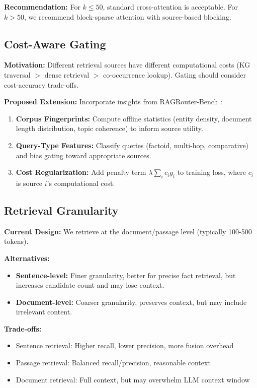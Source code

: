 \documentclass[11pt,a4paper]{article}
\begin{document}
\textbf{Recommendation:} For $k \leq 50$, standard cross-attention is acceptable. For $k > 50$, we recommend block-sparse attention with source-based blocking.

\subsection{Cost-Aware Gating}
\label{sec:cost_aware}

\textbf{Motivation:} Different retrieval sources have different computational costs (KG traversal $>$ dense retrieval $>$ co-occurrence lookup). Gating should consider cost-accuracy trade-offs.

\textbf{Proposed Extension:} Incorporate insights from RAGRouter-Bench \citep{ragrouter2024}:
\begin{enumerate}
    \item \textbf{Corpus Fingerprints:} Compute offline statistics (entity density, document length distribution, topic coherence) to inform source utility.
    
    \item \textbf{Query-Type Features:} Classify queries (factoid, multi-hop, comparative) and bias gating toward appropriate sources.
    
    \item \textbf{Cost Regularization:} Add penalty term $\lambda \sum_i c_i g_i$ to training loss, where $c_i$ is source $i$'s computational cost.
\end{enumerate}

\subsection{Retrieval Granularity}
\label{sec:granularity}

\textbf{Current Design:} We retrieve at the document/passage level (typically 100-500 tokens).

\textbf{Alternatives:}
\begin{itemize}
    \item \textbf{Sentence-level:} Finer granularity, better for precise fact retrieval, but increases candidate count and may lose context.
    \item \textbf{Document-level:} Coarser granularity, preserves context, but may include irrelevant content.
\end{itemize}

\textbf{Trade-offs:}
\begin{itemize}
    \item Sentence retrieval: Higher recall, lower precision, more fusion overhead
    \item Passage retrieval: Balanced recall/precision, reasonable context
    \item Document retrieval: Full context, but may overwhelm LLM context window
\end{itemize}
\end{document}

